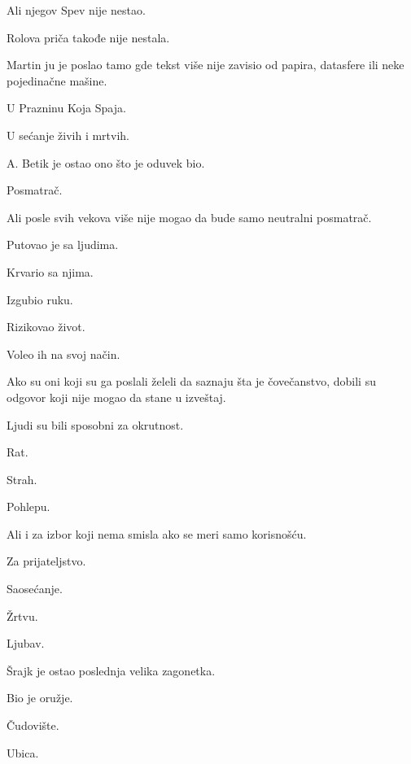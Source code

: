 Ali njegov Spev nije nestao.

\bigskip

Rolova priča takođe nije nestala.

\bigskip

Martin ju je poslao tamo gde tekst više nije zavisio od papira, datasfere ili neke pojedinačne mašine.

\bigskip

U Prazninu Koja Spaja.

\bigskip

U sećanje živih i mrtvih.

\bigskip

A. Betik je ostao ono što je oduvek bio.

\bigskip

Posmatrač.

\bigskip

Ali posle svih vekova više nije mogao da bude samo neutralni posmatrač.

\bigskip

Putovao je sa ljudima.

Krvario sa njima.

Izgubio ruku.

Rizikovao život.

Voleo ih na svoj način.

\bigskip

Ako su oni koji su ga poslali želeli da saznaju šta je čovečanstvo, dobili su odgovor koji nije mogao da stane u izveštaj.

\bigskip

Ljudi su bili sposobni za okrutnost.

Rat.

Strah.

Pohlepu.

\bigskip

Ali i za izbor koji nema smisla ako se meri samo korisnošću.

\bigskip

Za prijateljstvo.

Saosećanje.

Žrtvu.

Ljubav.

\bigskip

Šrajk je ostao poslednja velika zagonetka.

\bigskip

Bio je oružje.

Čudovište.

Ubica.

